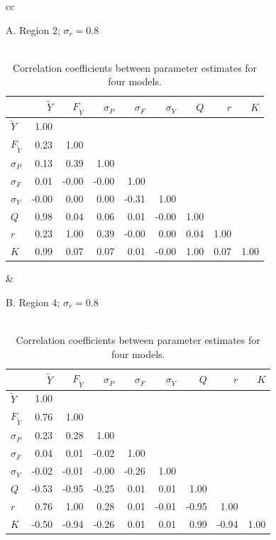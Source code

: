 \documentclass[12pt,letterpaper]{article}
\newcommand\MSY{\widetilde{Y}}
\newcommand\Fmsy{F_{\MSY}}
\begin{document}
\begin{table}
\caption{Correlation coefficients between parameter estimates for four
models.
\label{tab:correl}}
   \begin{tabular}[h]{cc}

      \begin{minipage}[t]{0.5\textwidth}
         \scriptsize

\begin{center}
{\normalsize A. Region 2; $\sigma_r = 0.8$}\\
~\\
\begin{tabular}{|lrrrrrrrr|}
\hline
&$\MSY$&$\Fmsy$&$\sigma_P$&$\sigma_F$&$\sigma_Y$&$Q$&$r$&$K$\\
\hline
$\MSY$&1.00&&&&&&&\\
$\Fmsy$&0.23&1.00&&&&&&\\
$\sigma_P$&0.13&0.39&1.00&&&&&\\
$\sigma_F$&0.01&-0.00&-0.00&1.00&&&&\\
$\sigma_Y$&-0.00&0.00&0.00&-0.31&1.00&&&\\
$Q$&0.98&0.04&0.06&0.01&-0.00&1.00&&\\
$r$&0.23&1.00&0.39&-0.00&0.00&0.04&1.00&\\
$K$&0.99&0.07&0.07&0.01&-0.00&1.00&0.07&1.00\\
\hline
\end{tabular}
\end{center}

      \end{minipage} &
      \begin{minipage}[t]{0.5\textwidth}
         \scriptsize

\begin{center}
{\normalsize B. Region 4; $\sigma_r = 0.8$}\\
~\\
\begin{tabular}{|lrrrrrrrr|}
\hline
&$\MSY$&$\Fmsy$&$\sigma_P$&$\sigma_F$&$\sigma_Y$&$Q$&$r$&$K$\\
\hline
$\MSY$&1.00&&&&&&&\\
$\Fmsy$&0.76&1.00&&&&&&\\
$\sigma_P$&0.23&0.28&1.00&&&&&\\
$\sigma_F$&0.04&0.01&-0.02&1.00&&&&\\
$\sigma_Y$&-0.02&-0.01&-0.00&-0.26&1.00&&&\\
$Q$&-0.53&-0.95&-0.25&0.01&0.01&1.00&&\\
$r$&0.76&1.00&0.28&0.01&-0.01&-0.95&1.00&\\
$K$&-0.50&-0.94&-0.26&0.01&0.01&0.99&-0.94&1.00\\
\hline
\end{tabular}
\end{center}


\end{minipage}
\end{tabular}
\end{table}
\end{document}
